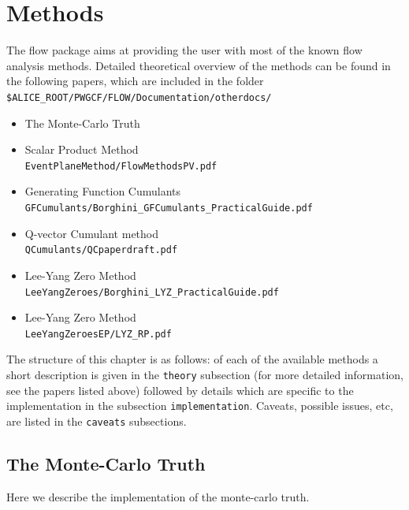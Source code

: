 \documentclass[a5paper]{book}
\numberwithin{equation}{subsection}
\begin{document}
\chapter{Methods}
\label{Methods}
The flow package aims at providing the user with most of the known flow analysis methods. Detailed theoretical overview of the methods can be found in the following papers, which are included in the folder \texttt{\$ALICE\_ROOT/PWGCF/FLOW/Documentation/otherdocs/}
\begin{itemize}
	\item The Monte-Carlo Truth
	\item Scalar Product Method \\ \hspace*{1cm} \texttt{EventPlaneMethod/FlowMethodsPV.pdf}
	\item Generating Function Cumulants \\ \hspace*{1cm} \texttt{GFCumulants/Borghini\_GFCumulants\_PracticalGuide.pdf}
	\item Q-vector Cumulant method \\ \hspace*{1cm} \texttt{QCumulants/QCpaperdraft.pdf} 
        \item Lee-Yang Zero Method \\ \hspace*{1cm} \texttt{LeeYangZeroes/Borghini\_LYZ\_PracticalGuide.pdf}
	\item Lee-Yang Zero Method \\ \hspace*{1cm} \texttt{LeeYangZeroesEP/LYZ\_RP.pdf}
\end{itemize}
The structure of this  chapter is as follows: of each of the available methods a short description is given in the \texttt{theory} subsection (for more detailed information, see the papers listed above) followed by details which are specific to the implementation in the subsection \texttt{implementation}. Caveats, possible issues, etc, are listed in the \texttt{caveats} subsections. 

\section{The Monte-Carlo Truth}
\label{MC}
Here we describe the implementation of the monte-carlo truth.
\end{document}
